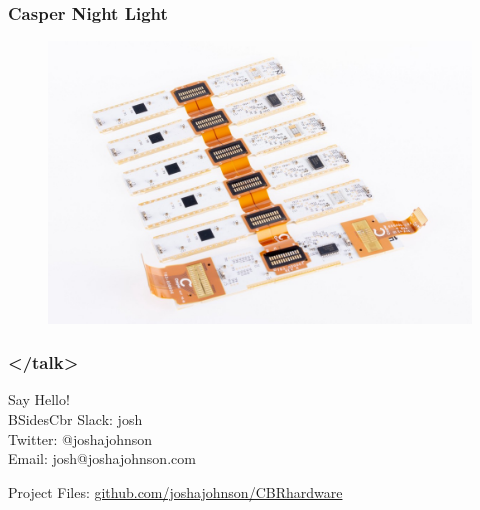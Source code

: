 \documentclass[t]{beamer}
\begin{document}
\begin{frame}[t]
\frametitle{Casper Night Light}
\begin{figure}
	\includegraphics[height=0.75\textheight]{casper2.jpeg}
\end{figure}

\end{frame}


\begin{frame}
\frametitle{</talk>}

Say Hello! \\
BSidesCbr Slack: josh\\
Twitter: @\textunderscore joshajohnson\\
Email: josh@joshajohnson.com\\
\vspace{4mm}

Project Files: \url{github.com/joshajohnson/CBRhardware}\\
\end{frame}
\end{document}
